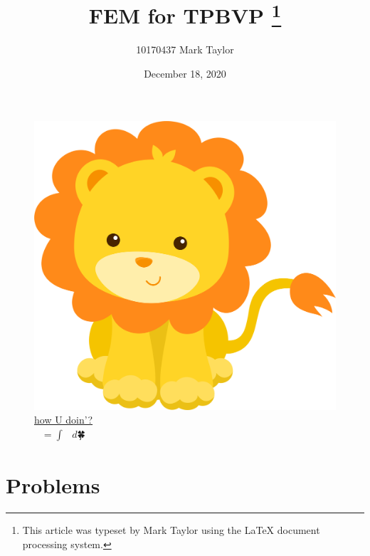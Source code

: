 \documentclass[a4paper,english]{article}
\begin{document}
	\thispagestyle{empty}
	\begin{figure}
		\centering
		\includegraphics[width=0.81\paperwidth]{img/lion.png}
		\caption*{\href{https://github.com/How-u-doing}{how U doin'?}
			\\ $🐳^{🐳^{🐳}} = ∫_{🎃}^{🎅} 🐑 \ d🍀$ }
		\label{cover:lion}
	\end{figure}
	\pagecolor{pink}
	\afterpage{\nopagecolor}
	\clearpage
	\newpage
	
	\title{FEM for TPBVP \thanks{This article was typeset by Mark Taylor using 
	the \protect\LaTeX{} document processing system.}}
	
	\author{10170437 Mark Taylor}
	
	\date{December 18, 2020}
	
	\maketitle
	
	\hypertarget{Contents}{}  %
	\tableofcontents
	
	\clearpage
	
	\section{Problems}
		
\end{document}

